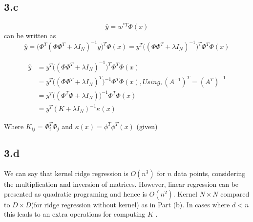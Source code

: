 \documentclass[10pt,letterpaper]{article}
\begin{document}
\subsection{3.c}
$$\hat{y} = w^{*T} \Phi(x)$$
can be written as 
		$$\hat{y} =  \big(\Phi^T(\Phi\Phi^T + \lambda I_N)^{-1} y\big)^T\Phi(x) = y^T \big((\Phi\Phi^T + \lambda I_N)^{-1}\big)^T\Phi^T\Phi(x)$$
			
		\begin{align*}
		\hat{y} &= y^T \big((\Phi\Phi^T + \lambda I_N)^{-1}\big)^T\Phi^T\Phi(x) \\
		&=  y^T \big((\Phi\Phi^T + \lambda I_N)^{T}\big)^{-1}\Phi^T\Phi(x), Using, (A^{-1})^T = (A^T)^{-1}\\
		&=  y^T \big((\Phi^T\Phi + \lambda I_N)\big)^{-1}\Phi^T\Phi(x)\\
		&= y^T(K+\lambda I_N)^{-1} \kappa(x)
		\end{align*}
		
		Where $K_{ij}= \Phi_i^T\Phi_j$ and $\kappa(x) = \phi^T\phi^T(x)$ (given)
\subsection{3.d}		
		We can say that kernel ridge regression is $O(n^3)$ for $n$ data points, considering the multiplication and inversion of matrices. However, linear regression can be presented  as quadratic programing and hence is $O(n^2)$. Kernel $N\times N$ compared to $D \times D$(for ridge regression without kernel) as in Part (b). In cases where $d<n$ this leads to an extra operations for computing $K$ .
		
\end{document}
